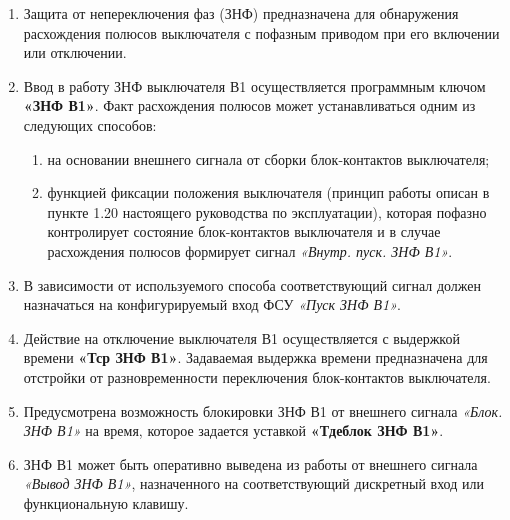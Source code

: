 
\color{black}

\begin{enumerate}[label=\arabic{section}.\arabic{subsection}.\arabic{enumi}, labelsep=4pt, leftmargin=0pt, itemindent=57pt, itemsep=0pt, parsep=0pt] %

\item
Защита от непереключения фаз (ЗНФ) предназначена для обнаружения расхождения полюсов выключателя с пофазным приводом при его включении или отключении. 

\item
Ввод в работу ЗНФ выключателя В1 осуществляется программным ключом \textbf{«ЗНФ В1»}. Факт расхождения полюсов может устанавливаться одним из следующих способов:

\begin{enumerate}[label=\arabic*)]
\item на основании внешнего сигнала от сборки блок-контактов выключателя;
\item функцией фиксации положения выключателя (принцип работы описан в пункте 1.20 настоящего руководства по эксплуатации), которая пофазно контролирует состояние блок-контактов выключателя и в случае расхождения полюсов формирует сигнал \textit{«Внутр. пуск. ЗНФ В1»}.
\end{enumerate}

\item
В зависимости от используемого способа соответствующий сигнал должен назначаться на конфигурируемый вход ФСУ \textit{«Пуск ЗНФ В1»}.

\item
Действие на отключение выключателя В1 осуществляется с выдержкой времени \textbf{«Тср ЗНФ В1»}. Задаваемая выдержка времени предназначена для отстройки от разновременности переключения блок-контактов выключателя.

\item
Предусмотрена возможность блокировки ЗНФ В1 от внешнего сигнала \textit{«Блок. ЗНФ В1»} на время, которое задается уставкой \textbf{«Тдеблок ЗНФ В1»}.

\item
ЗНФ В1 может быть оперативно выведена из работы от внешнего сигнала \textit{«Вывод ЗНФ В1»}, назначенного на соответствующий дискретный вход или функциональную клавишу.


\end{enumerate}
